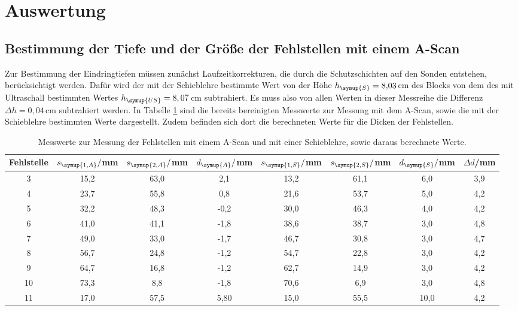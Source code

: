 \section{Auswertung}
\label{sec:Auswertung}

\subsection{Bestimmung der Tiefe und der Größe der Fehlstellen mit einem A-Scan}
\label{subsec:A_scan_Fehlstellen}

Zur Bestimmung der Eindringtiefen müssen zunächst Laufzeitkorrekturen, die durch
die Schutzschichten auf den Sonden entstehen, berücksichtigt werden. Dafür wird der
mit der Schieblehre bestimmte Wert von der Höhe $h_{\symup{S}}=8{,}03\,$cm des Blocks
von dem des mit Ultraschall bestimmten Wertes $h_{\symup{US}}=8,07\,$cm subtrahiert.
Es muss also von allen Werten in dieser Messreihe die Differenz $\Delta h=0{,}04\,$cm
subtrahiert werden. In Tabelle \ref{tab:messwerte} sind die  bereits bereinigten
Messwerte zur Messung mit dem A-Scan, sowie die mit der Schieblehre bestimmten
Werte dargestellt. Zudem befinden sich dort die berechneten Werte für die Dicken
der Fehlstellen.

\begin{table}[htp]
	\begin{center}
    \caption{Messwerte zur Messung der Fehlstellen mit einem A-Scan und mit einer Schieblehre,
    sowie daraus berechnete Werte.}
    \label{tab:messwerte}
		\begin{tabular}{cccccccc}
		\toprule
			{Fehlstelle} & {$s_{\symup{1,A}}/$mm} & {$s_{\symup{2,A}}/$mm} & {$d_{\symup{A}}/$mm} &
      {$s_{\symup{1,S}}/$mm} & {$s_{\symup{2,S}}/$mm} & {$d_{\symup{S}}/$mm} & {$\Delta d$/mm}\\
			\midrule
			3   & 15,2 & 63,0 & 2,1 & 13,2 & 61,1 & 6,0 & 3,9\\
			4   & 23,7 & 55,8 & 0,8 & 21,6 & 53,7 & 5,0 & 4,2\\
			5   & 32,2 & 48,3 & -0,2 & 30,0 & 46,3 & 4,0 & 4,2\\
			6   & 41,0 & 41,1 & -1,8 & 38,6 & 38,7 & 3,0 & 4,8\\
			7   & 49,0 & 33,0 & -1,7 & 46,7 & 30,8 & 3,0 & 4,7\\
			8   & 56,7 & 24,8 & -1,2 & 54,7 & 22,8 & 3,0 & 4,2\\
			9   & 64,7 & 16,8 & -1,2 & 62,7 & 14,9 & 3,0 & 4,2\\
			10  & 73,3 & 8,8  & -1,8 & 70,6 & 6,9 & 3,0 & 4,8\\
			11  & 17,0 & 57,5 & 5,80 & 15,0 & 55,5 & 10,0 & 4,2\\
		\bottomrule
		\end{tabular}
	\end{center}
\end{table}

